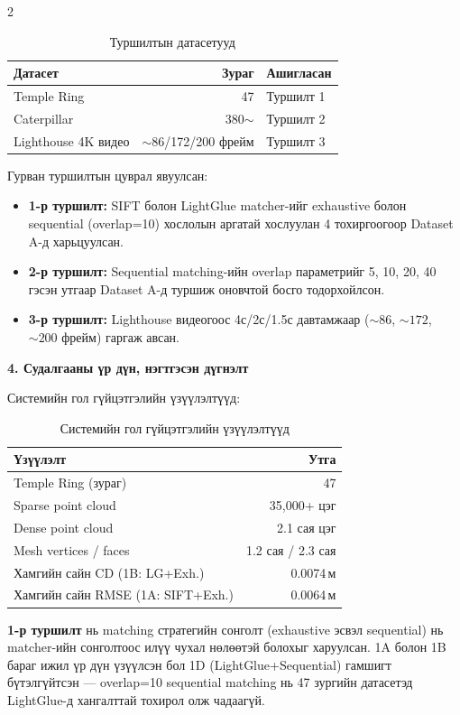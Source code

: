 \begin{multicols}{2}
\begin{table}[H]
\centering
\caption{Туршилтын датасетууд}
\label{tab:tovchlol_datasets}
\scriptsize
\setlength{\tabcolsep}{3pt}
\begin{tabular}{|l|r|l|}
\hline
\textbf{Датасет} & \textbf{Зураг} & \textbf{Ашигласан} \\ \hline
Temple Ring & 47 & Туршилт 1 \\ \hline
Caterpillar & 380${\sim}$ & Туршилт 2 \\ \hline
Lighthouse 4K видео & ${\sim}$86/172/200 фрейм & Туршилт 3 \\ \hline
\end{tabular}
\end{table}

Гурван туршилтын цуврал явуулсан:
\begin{itemize}
    \item \textbf{1-р туршилт:} SIFT болон LightGlue matcher-ийг exhaustive болон sequential (overlap=10) хослолын аргатай хослуулан 4 тохиргоогоор Dataset A-д харьцуулсан.
    \item \textbf{2-р туршилт:} Sequential matching-ийн overlap параметрийг 5, 10, 20, 40 гэсэн утгаар Dataset A-д туршиж оновчтой босго тодорхойлсон.
    \item \textbf{3-р туршилт:} Lighthouse видеогоос 4с/2с/1.5с давтамжаар (${\sim}86$, ${\sim}172$, ${\sim}200$ фрейм) гаргаж авсан.
\end{itemize}

\noindent\textbf{4. Судалгааны үр дүн, нэгтгэсэн дүгнэлт}

Системийн гол гүйцэтгэлийн үзүүлэлтүүд:

\begin{table}[H]
\centering
\caption{Системийн гол гүйцэтгэлийн үзүүлэлтүүд}
\label{tab:tovchlol_results}
\scriptsize
\setlength{\tabcolsep}{3pt}
\begin{tabular}{|l|r|}
\hline
\textbf{Үзүүлэлт} & \textbf{Утга} \\ \hline
Temple Ring (зураг) & 47 \\ \hline
Sparse point cloud & 35{,}000+ цэг \\ \hline
Dense point cloud & 2.1 сая цэг \\ \hline
Mesh vertices / faces & 1.2 сая / 2.3 сая \\ \hline
Хамгийн сайн CD (1B: LG+Exh.) & 0.0074\,м \\ \hline
Хамгийн сайн RMSE (1A: SIFT+Exh.) & 0.0064\,м \\ \hline
\end{tabular}
\end{table}

\textbf{1-р туршилт} нь matching стратегийн сонголт (exhaustive эсвэл sequential) нь matcher-ийн сонголтоос илүү чухал нөлөөтэй болохыг харуулсан. 1A болон 1B бараг ижил үр дүн үзүүлсэн бол 1D (LightGlue+Sequential) гамшигт бүтэлгүйтсэн --- overlap=10 sequential matching нь 47 зургийн датасетэд LightGlue-д хангалттай тохирол олж чадаагүй.
\end{multicols}

